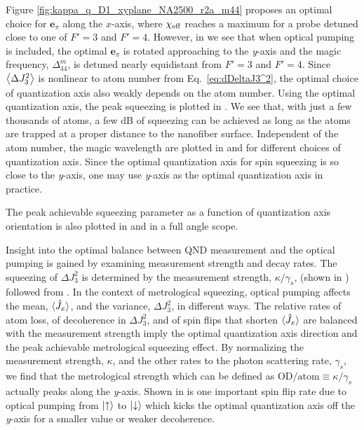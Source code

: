 \documentclass[preprint,aps,pra,onecolumn]{revtex4-1} %
\newcommand{\qaxis}{\mathbf{e}_\pi}
\newcommand{\varz}{\Delta J_3^2}
\begin{document}
 
Figure \ref{fig:kappa_q_D1_xyplane_NA2500_r2a_m44} proposes an optimal choice for $\qaxis$ along the $x$-axis, where $\chi_{\text{eff}}$ reaches a maximum for a probe detuned close to one of $F'=3$ and $F'=4$. 
However, in  we see that when optical pumping is included, the optimal $\qaxis$ is rotated approaching to the \emph{y}-axis and the magic frequency, $ \Delta_{44}^m $, is detuned nearly equidistant from $F'=3$ and $F'=4$. 
Since $ \big\langle \Delta J_3^2 \big\rangle $ is nonlinear to atom number from Eq.~\eqref{eq:dDeltaJ3^2}, the optimal choice of quantization axis also weakly depends on the atom number. 
Using the optimal quantization axis, the peak squeezing is plotted in .
We see that, with just a few thousands of atoms, a few dB of squeezing can be achieved as long as the atoms are trapped at a proper distance to the nanofiber surface. 
Independent of the atom number, the magic wavelength 
are plotted in  and  for different choices of quantization axis. 
Since the optimal quantization axis for spin squeezing is so close to the \emph{y}-axis, one may use \emph{y}-axis as the optimal quantization axis in practice. 

The peak achievable squeezing parameter as a function of quantization axis orientation is also plotted in  and  in a full angle scope. 

Insight into the optimal balance between QND measurement and the optical pumping is gained by examining measurement strength and decay rates. 
The squeezing of $\varz$ is determined by the measurement strength, $\kappa/\gamma_s$, (shown in ) followed from . 
In the context of metrological squeezing, optical pumping affects the mean, $\langle{\hat{J}_x}\rangle$, and the variance, $\varz$, in different ways. 
The relative rates of atom loss, of decoherence in $\varz$, and of spin flips that shorten $\langle{\hat{J}_x}\rangle$ are balanced with the measurement strength imply the optimal quantization axis direction and the peak achievable metrological squeezing effect.
By normalizing the measurement strength, $ \kappa $, and the other rates to the photon scattering rate, $ \gamma_s $, we find that the metrological strength which can be defined as $ \mathrm{OD}/\mathrm{atom}\equiv \kappa/\gamma_s $ actually peaks along the \emph{y}-axis. 
Shown in  is one important spin flip rate due to optical pumping from $ \lvert{\uparrow}\rangle $ to $ \lvert{\downarrow}\rangle $ which kicks the optimal quantization axis off the \emph{y}-axis for a smaller value or weaker decoherence.
\end{document}
